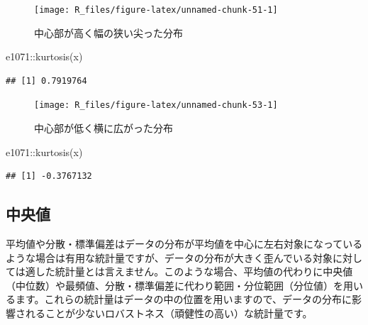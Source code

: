 \documentclass[
  12pt,
]{book}
\newenvironment{Shaded}{\begin{snugshade}}{\end{snugshade}}
\newcommand{\FunctionTok}[1]{\textcolor[rgb]{0.00,0.00,0.00}{#1}}
\newcommand{\NormalTok}[1]{#1}
\newcommand{\SpecialCharTok}[1]{\textcolor[rgb]{0.00,0.00,0.00}{#1}}
\begin{document}
\begin{figure}[H]

{\centering \texttt{[image: R\_files/figure-latex/unnamed-chunk-51-1]} 

}

\caption{中心部が高く幅の狭い尖った分布}\label{fig:unnamed-chunk-51}
\end{figure}

\begin{Shaded}
\begin{Highlighting}[numbers=left,,]
\NormalTok{e1071}\SpecialCharTok{::}\FunctionTok{kurtosis}\NormalTok{(x)}
\end{Highlighting}
\end{Shaded}

\begin{verbatim}
## [1] 0.7919764
\end{verbatim}

\begin{figure}[H]

{\centering \texttt{[image: R\_files/figure-latex/unnamed-chunk-53-1]} 

}

\caption{中心部が低く横に広がった分布}\label{fig:unnamed-chunk-53}
\end{figure}

\begin{Shaded}
\begin{Highlighting}[numbers=left,,]
\NormalTok{e1071}\SpecialCharTok{::}\FunctionTok{kurtosis}\NormalTok{(x)}
\end{Highlighting}
\end{Shaded}

\begin{verbatim}
## [1] -0.3767132
\end{verbatim}

\hypertarget{ux4e2dux592eux5024}{%
\subsection{中央値}\label{ux4e2dux592eux5024}}

平均値や分散・標準偏差はデータの分布が平均値を中心に左右対象になっているような場合は有用な統計量ですが、データの分布が大きく歪んでいる対象に対しては適した統計量とは言えません。このような場合、平均値の代わりに中央値（中位数）や最頻値、分散・標準偏差に代わり範囲・分位範囲（分位値）を用いるます。これらの統計量はデータの中の位置を用いますので、データの分布に影響されることが少ないロバストネス（頑健性の高い）な統計量です。
\end{document}
